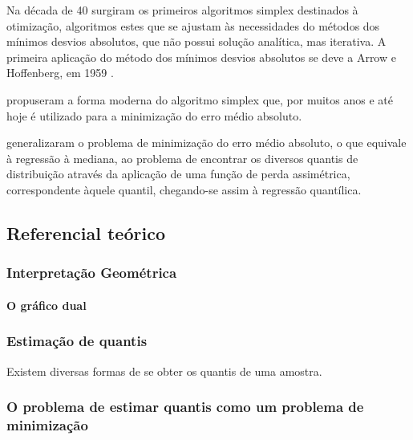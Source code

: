 \documentclass[a4paper, 12pt]{article}
\let\oldparagraph\paragraph
\renewcommand{\paragraph}[1]{\oldparagraph{#1}\mbox{}}
\begin{document}
Na década de 40 surgiram os primeiros algoritmos simplex destinados à
otimização, algoritmos estes que se ajustam às necessidades do métodos
dos mínimos desvios absolutos, que não possui solução analítica, mas
iterativa. A primeira aplicação do método dos mínimos desvios absolutos
se deve a Arrow e Hoffenberg, em 1959 \autocite[281]{tortoise}.

\textcite{barrodale} propuseram a forma moderna do algoritmo simplex
que, por muitos anos e até hoje é utilizado para a minimização do erro
médio absoluto.

\textcite{koenker1978} generalizaram o problema de minimização do erro
médio absoluto, o que equivale à regressão à mediana, ao problema de
encontrar os diversos quantis de distribuição através da aplicação de
uma função de perda assimétrica, correspondente àquele quantil,
chegando-se assim à regressão quantílica.

\hypertarget{referencial-teorico}{%
\subsection{Referencial teórico}\label{referencial-teorico}}

\hypertarget{interpretacao-geometrica}{%
\subsubsection{Interpretação
Geométrica}\label{interpretacao-geometrica}}

\hypertarget{o-grafico-dual}{%
\paragraph{O gráfico dual}\label{o-grafico-dual}}

\hypertarget{estimacao-de-quantis}{%
\subsubsection{Estimação de quantis}\label{estimacao-de-quantis}}

Existem diversas formas de se obter os quantis de uma amostra.

\hypertarget{o-problema-de-estimar-quantis-como-um-problema-de-minimizacao}{%
\subsubsection{O problema de estimar quantis como um problema de
minimização}\label{o-problema-de-estimar-quantis-como-um-problema-de-minimizacao}}
\end{document}
